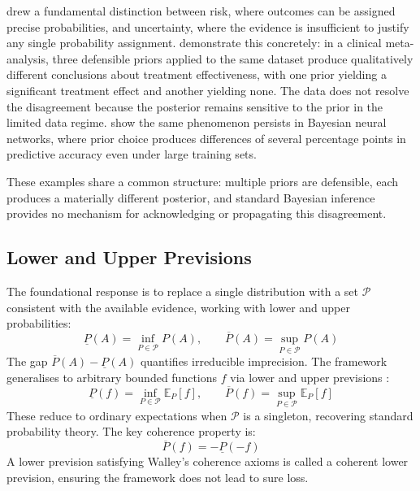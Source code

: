     \citet{knight1921} drew a fundamental distinction between risk, where outcomes can be assigned precise probabilities, and uncertainty, where the evidence is insufficient to justify any single probability assignment. \citet{kass1989} demonstrate this concretely: in a clinical meta-analysis, three defensible priors applied to the same dataset produce qualitatively different conclusions about treatment effectiveness, with one prior yielding a significant treatment effect and another yielding none. The data does not resolve the disagreement because the posterior remains sensitive to the prior in the limited data regime. \citet{wenzel2020} show the same phenomenon persists in Bayesian neural networks, where prior choice produces differences of several percentage points in predictive accuracy even under large training sets.

    These examples share a common structure: multiple priors are defensible, each produces a materially different posterior, and standard Bayesian inference provides no mechanism for acknowledging or propagating this disagreement.

    \subsection{Lower and Upper Previsions}

    The foundational response is to replace a single distribution with a set $\mathcal{P}$ consistent with the available evidence, working with lower and upper probabilities:
    \begin{equation}
        \underline{P}(A) = \inf_{P \in \mathcal{P}} P(A), \qquad \overline{P}(A) = \sup_{P \in \mathcal{P}} P(A)
    \end{equation}
    The gap $\overline{P}(A) - \underline{P}(A)$ quantifies irreducible imprecision. The framework generalises to arbitrary bounded functions $f$ via lower and upper previsions \citep{walley1991}:
    \begin{equation}
        \underline{P}(f) = \inf_{P \in \mathcal{P}} \mathbb{E}_P[f], \qquad \overline{P}(f) = \sup_{P \in \mathcal{P}} \mathbb{E}_P[f]
    \end{equation}
    These reduce to ordinary expectations when $\mathcal{P}$ is a singleton, recovering standard probability theory. The key coherence property is:
    \begin{equation}
        \overline{P}(f) = -\underline{P}(-f)
    \end{equation}
    A lower prevision satisfying Walley's coherence axioms is called a coherent lower prevision, ensuring the framework does not lead to sure loss.

